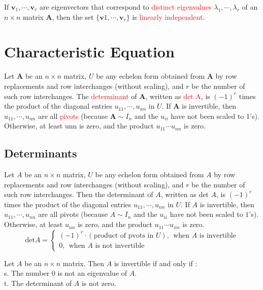 \documentclass[12pt,a4paper]{article}
\begin{document}
\begin{tcolorbox}[colback=green!5,colframe=green!40!black,title=Theorem]
If $\mathbf{v}_1, \cdots , \mathbf{v}_r$ are eigenvectors that correspond to \textcolor{red}{distinct eigenvalues} $\lambda_1, \cdots , \lambda_r$ of an $n\times n$ matrix $\mathbf{A}$, then the set $\{ \mathbf{v}1, \cdots, \mathbf{v}_r \}$ is \textcolor{red}{linearly independent}.
\end{tcolorbox}




\section{Characteristic Equation}
Let $\mathbf{A}$ be an $n\times n$ matrix, $U$ be any echelon form obtained from $\mathbf{A}$ by row replacements and row interchanges (without scaling), and $r$ be the number of such row interchanges. The \textcolor{red}{determinant} of $\mathbf{A}$, written as \textcolor{red}{det A}, is $(−1)^r$ times the product of the diagonal entries $u_{11}, \cdots , u_{nn}$ in $U$. If $\mathbf{A}$ is invertible, then $u_{11}, \cdots , u_{nn}$ are all \textcolor{red}{pivots} (because
$\mathbf{A} \sim I_n$ and the $u_{ii}$ have not been scaled to 1's). Otherwise, at least unn is zero, and the product $u_{11} \cdots u_{nn}$ is zero. 


\subsection{Determinants}
Let $A$ be an $n\times n$ matrix, $U$ be any echelon form obtained from $A$ by row replacements and row interchanges (without scaling), and $r$ be the number of such row interchanges. Then the determinant of $A$, written as det $A$, is $(-1)^r$ times the product of the diagonal entries $u_{11}, \cdots, u_{nn}$ in $U$. If $A$ is invertible, then $u_{11}, \cdots, u_{nn}$ are all pivots (because $A \sim I_n$ and the $u_{ii}$ have not been scaled to $1$'s). Otherwise, at least $u_{nn}$ is zero, and the product $u_{11}\cdots u_{nn}$ is zero.
\begin{equation}
\text{det} A = 
\left\{\begin{array}{ll}
(-1)^r \cdot (\text{product of pvots in $U$}), ~~\text{when $A$ is invertible} \\
0,  ~~\text{when $A$ is not invertible}
\end{array}\right.
\end{equation}


\begin{tcolorbox}[colback=green!5,colframe=green!40!black,title= The Invertible Matrix Theorem (continued)]
Let $A$ be an $n\times n$ matrix. Then $A$ is invertible if and only if : \\
s. The number $0$ is not an eigenvalue of $A$. \\
t. The determinant of $A$ is not zero.
\end{tcolorbox}
\end{document}
